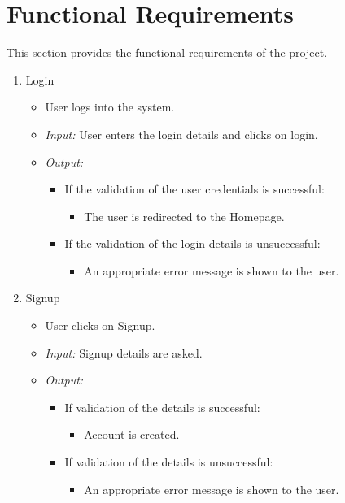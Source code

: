 \documentclass[11pt]{report} %
\begin{document}
\section{Functional Requirements}
This section provides the functional requirements of the project.
\begin{enumerate}
	\item
		Login
		\begin{itemize}
			\item
				User logs into the system.
			\item
				\emph{Input:} User enters the login details and clicks on login.
			\item
				\emph{Output:} 
					\begin{itemize}
						\item
							If the validation of the user credentials is successful:
							\begin{itemize}
								\item
									The user is redirected to the Homepage.
							\end{itemize}


						\item
							If the validation of the login details is unsuccessful:
							\begin{itemize}
								\item
									An appropriate error message is shown to the user.
							\end{itemize}
					\end{itemize}
		\end{itemize}

	\item
		Signup
		\begin{itemize}
			\item
				User clicks on Signup.
			\item
				\emph{Input:} Signup details are asked.
			\item
				\emph{Output:} 
					\begin{itemize}
						\item	
							If validation of the details is successful:
							\begin{itemize}
								\item
									Account is created.
							\end{itemize}

						\item
							If validation of the details is unsuccessful:
							\begin{itemize}
								\item
									An appropriate error message is shown to the user.
							\end{itemize}
					\end{itemize}
		\end{itemize}


\end{enumerate}
\end{document}
